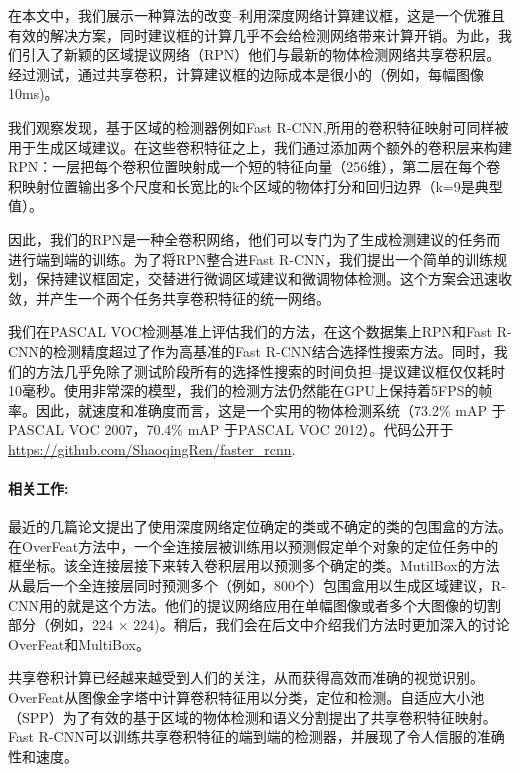 \documentclass[12pt,a4paper,titlepage]{article}
\begin{document}
在本文中，我们展示一种算法的改变--利用深度网络计算建议框，这是一个优雅且有效的解决方案，同时建议框的计算几乎不会给检测网络带来计算开销。为此，我们引入了新颖的区域提议网络（RPN）他们与最新的物体检测网络共享卷积层。经过测试，通过共享卷积，计算建议框的边际成本是很小的（例如，每幅图像10ms)。\par

我们观察发现，基于区域的检测器例如Fast R-CNN,所用的卷积特征映射可同样被用于生成区域建议。在这些卷积特征之上，我们通过添加两个额外的卷积层来构建RPN：一层把每个卷积位置映射成一个短的特征向量（256维），第二层在每个卷积映射位置输出多个尺度和长宽比的k个区域的物体打分和回归边界（k=9是典型值）。\par

因此，我们的RPN是一种全卷积网络，他们可以专门为了生成检测建议的任务而进行端到端的训练。为了将RPN整合进Fast R-CNN，我们提出一个简单的训练规划，保持建议框固定，交替进行微调区域建议和微调物体检测。这个方案会迅速收敛，并产生一个两个任务共享卷积特征的统一网络。\par

我们在PASCAL VOC检测基准上评估我们的方法，在这个数据集上RPN和Fast R-CNN的检测精度超过了作为高基准的Fast R-CNN结合选择性搜索方法。同时，我们的方法几乎免除了测试阶段所有的选择性搜索的时间负担--提议建议框仅仅耗时10毫秒。使用非常深的模型，我们的检测方法仍然能在GPU上保持着5FPS的帧率。因此，就速度和准确度而言，这是一个实用的物体检测系统（73.2\% mAP 于PASCAL VOC 2007，70.4\% mAP 于PASCAL VOC 2012）。代码公开于 \url{https://github.com/ShaoqingRen/faster_rcnn}.

\paragraph{相关工作:}
最近的几篇论文提出了使用深度网络定位确定的类或不确定的类的包围盒的方法。在OverFeat方法中，一个全连接层被训练用以预测假定单个对象的定位任务中的框坐标。该全连接层接下来转入卷积层用以预测多个确定的类。MutilBox的方法从最后一个全连接层同时预测多个（例如，800个）包围盒用以生成区域建议，R-CNN用的就是这个方法。他们的提议网络应用在单幅图像或者多个大图像的切割部分（例如，224 $\times$ 224)。稍后，我们会在后文中介绍我们方法时更加深入的讨论OverFeat和MultiBox。\par

共享卷积计算已经越来越受到人们的关注，从而获得高效而准确的视觉识别。OverFeat从图像金字塔中计算卷积特征用以分类，定位和检测。自适应大小池（SPP）为了有效的基于区域的物体检测和语义分割提出了共享卷积特征映射。Fast R-CNN可以训练共享卷积特征的端到端的检测器，并展现了令人信服的准确性和速度。
\end{document}

